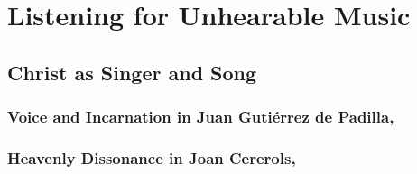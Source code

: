 \part{Listening for Unhearable Music}

\chapter{Christ as Singer and Song}

\section{Voice and Incarnation in Juan Gutiérrez de Padilla, }

\section{Heavenly Dissonance in Joan Cererols, }


